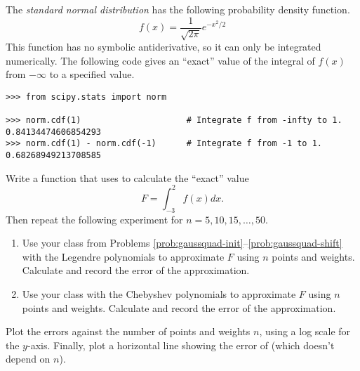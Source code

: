 \begin{comment}
Another common hallmark of quadrature is that it can be used adaptively.
It is common in practice to refine the points of a quadrature estimate on an interval where a function is observed to be changing rapidly.
This allows for more accurate computation at a relatively low computational cost.
This is the approach used by the function \li{scipy.integrate.quad()}.
\end{comment}

\begin{problem} %
The \emph{standard normal distribution} has the following probability density function.
\[f(x) = \frac{1}{\sqrt{2 \pi}} e^{-x^2/2}\]
This function has no symbolic antiderivative, so it can only be integrated numerically.
The following code gives an ``exact'' value of the integral of $f(x)$ from $-\infty$ to a specified value.

\begin{lstlisting}
>>> from scipy.stats import norm

>>> norm.cdf(1)                     # Integrate f from -infty to 1.
0.84134474606854293
>>> norm.cdf(1) - norm.cdf(-1)      # Integrate f from -1 to 1.
0.68268949213708585
\end{lstlisting}

Write a function that uses  to calculate the ``exact'' value
\[
F = \int_{-3}^2 f(x)dx.
\]
Then repeat the following experiment for $n=5,10,15,\ldots,50$.
\begin{enumerate}
\item Use your class from Problems \ref{prob:gaussquad-init}--\ref{prob:gaussquad-shift} with the Legendre polynomials to approximate $F$ using $n$ points and weights.
Calculate and record the error of the approximation.
\item Use your class with the Chebyshev polynomials to approximate $F$ using $n$ points and weights.
Calculate and record the error of the approximation.
\end{enumerate}
Plot the errors against the number of points and weights $n$, using a log scale for the $y$-axis.
Finally, plot a horizontal line showing the error of  (which doesn't depend on $n$).
\end{problem}


